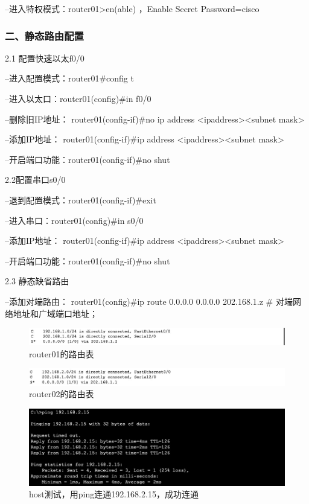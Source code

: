\documentclass[lang=cn,11pt,a4paper,cite=authoryear]{elegantpaper}
\begin{document}
--进入特权模式：router01>en(able) ，Enable Secret Password=cisco

\subsubsection{二、静态路由配置}

2.1 配置快速以太f0/0

--进入配置模式：router01\#config t

--进入以太口：router01(config)\#in f0/0

--删除旧IP地址： router01(config-if)\#no ip address <ipaddress><subnet mask>

--添加IP地址： router01(config-if)\#ip address <ipaddress><subnet mask>

--开启端口功能：router01(config-if)\#no shut

2.2配置串口s0/0

--退到配置模式：router01(config-if)\#exit

--进入串口：router01(config)\#in s0/0

--添加IP地址： router01(config-if)\#ip address <ipaddress><subnet mask>

--开启端口功能：router01(config-if)\#no shut

2.3 静态缺省路由

--添加对端路由： router01(config)\#ip route 0.0.0.0 0.0.0.0 202.168.1.z \# 对端网络地址和广域端口地址；

\begin{figure}[htbp]
	\centering
	\includegraphics[width=0.7\linewidth]{image/screenshot030}
	\caption{router01的路由表}
	\label{fig:screenshot030}
\end{figure}

\begin{figure}[htbp]
	\centering
	\includegraphics[width=0.7\linewidth]{image/screenshot031}
	\caption{router02的路由表}
	\label{fig:screenshot031}
\end{figure}


\begin{figure}[htbp]
	\centering
	\includegraphics[width=0.7\linewidth]{image/screenshot032}
	\caption{host测试，用ping连通192.168.2.15，成功连通}
	\label{fig:screenshot032}
\end{figure}
\end{document}
